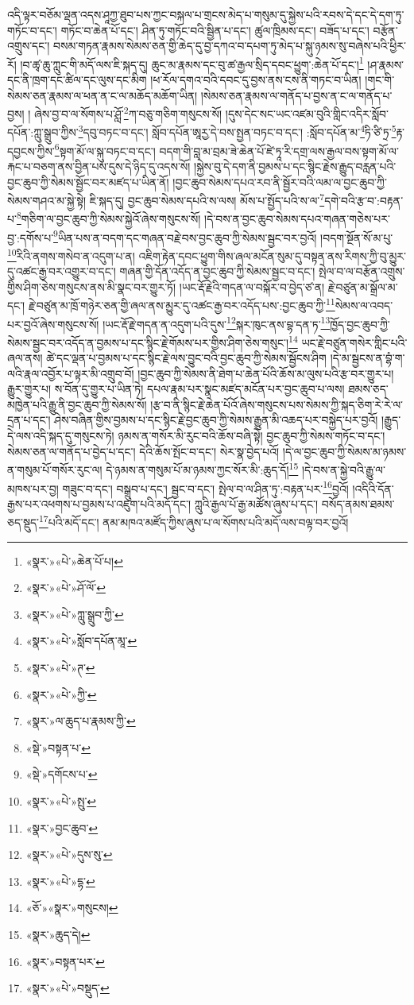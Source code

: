 འདི་ལྟར་བཅོམ་ལྡན་འདས་ཤཱཀྱ་ཐུབ་པས་ཀྱང་བསྐལ་པ་གྲངས་མེད་པ་གསུམ་དུ་སྐྱེས་པའི་རབས་དེ་དང་དེ་དག་ཏུ་གཏོང་བ་དང་། གཏོང་བ་ཆེན་པོ་དང་། ཤིན་ཏུ་གཏོང་བའི་སྦྱིན་པ་དང་། ཚུལ་ཁྲིམས་དང་། བཟོད་པ་དང་། བརྩོན་འགྲུས་དང་། བསམ་གཏན་རྣམས་སེམས་ཅན་གྱི་ཆེད་དུ་བྱ་དཀའ་བ་དཔག་ཏུ་མེད་པ་སྐུ་ཉམས་སུ་བཞེས་པའི་ཕྱིར་རོ། །བ་ཚྭ་ཆུ་ཀླུང་གི་མདོ་ལས་ཇི་སྐད་དུ། ཆུང་མ་རྣམས་དང་བུ་ཚ་རྒྱལ་སྲིད་དབང་ཕྱུག་:ཆེན་པོ་དང་།\footnote{«སྣར་»«པེ་»ཆེན་པོ་པ།} །ཤ་རྣམས་དང་ནི་ཁྲག་དང་ཚིལ་དང་ལུས་དང་མིག །ཕ་རོལ་དགའ་བའི་དབང་དུ་བྱས་ནས་ངས་ནི་གཏང་བ་ཡིན། །གང་གི་སེམས་ཅན་རྣམས་ལ་ཕན་ན་ང་ལ་མཆོད་མཆོག་ཡིན། །སེམས་ཅན་རྣམས་ལ་གནོད་པ་བྱས་ན་ང་ལ་གནོད་པ་བྱས། །
ཞེས་བྱ་བ་ལ་སོགས་པ་ཤློ་\footnote{«སྣར་»«པེ་»ཤོ་ལོ་}ཀ་བཅུ་གཅིག་གསུངས་སོ། །དུས་དེང་སང་ཡང་འཛམ་བུའི་གླིང་འདིར་སློབ་དཔོན་:ཀླུ་སྒྲུབ་ཀྱིས་\footnote{«སྣར་»«པེ་»ཀླུ་སྒྲུབ་ཀྱི་}དབུ་བཏང་བ་དང་། སློབ་དཔོན་ཨཱརྱ་དེ་བས་སྤྱན་བཏང་བ་དང་། :སློབ་དཔོན་མ་\footnote{«སྣར་»«པེ་»སློབ་དཔོན་མཱ་}ཏི་ཙི་ཏྲ་\footnote{«སྣར་»«པེ་»ཊ་}རྟ་དབྱངས་ཀྱིས་\footnote{«སྣར་»«པེ་»ཀྱི་}སྟག་མོ་ལ་སྐུ་བཏང་བ་དང་། བདག་གི་བླ་མ་བྲམ་ཟེ་ཆེན་པོ་ཛེ་ཏཱ་རི་དགྲ་ལས་རྒྱལ་བས་སྟག་མོ་ལ་རྐང་པ་བཅག་ནས་བྱིན་པས་དུས་དེ་ཉིད་དུ་འདས་སོ། །སྐྱེས་བུ་དེ་དག་ནི་བྱམས་པ་དང་སྙིང་རྗེས་རྒྱུད་བརླན་པའི་བྱང་ཆུབ་ཀྱི་སེམས་སྦྱོང་བར་མཛད་པ་ཡིན་ནོ། །བྱང་ཆུབ་སེམས་དཔའ་རབ་ནི་སྦྱོར་བའི་ལམ་ལ་བྱང་ཆུབ་ཀྱི་སེམས་གཤའ་མ་སྐྱེ་སྟེ། ཇི་སྐད་དུ། བྱང་ཆུབ་སེམས་དཔའི་ས་ལས། མོས་པ་སྤྱོད་པའི་ས་ལ་\footnote{«སྣར་»ལ་ཆུད་པ་རྣམས་ཀྱི་}དགེ་བའི་རྩ་བ་:བརྟན་པ་\footnote{«སྡེ་»བསྟན་པ་}གཅིག་ལ་བྱང་ཆུབ་ཀྱི་སེམས་སྐྱེའོ་ཞེས་གསུངས་སོ། །དེ་བས་ན་བྱང་ཆུབ་སེམས་དཔའ་གཞན་གཅེས་པར་བྱ་:དགོས་པ་\footnote{«སྡེ་»དགོངས་པ་}ཡིན་པས་ན་བདག་དང་གཞན་བརྗེ་བས་བྱང་ཆུབ་ཀྱི་སེམས་སྦྱང་བར་བྱའོ། །བདག་སྔོན་སོ་མ་པུ་\footnote{«སྣར་»«པེ་»སྤུ་}རིའི་ནགས་གསེབ་ན་འདུག་པ་ན། འཇིག་རྟེན་དབང་ཕྱུག་གིས་ཞལ་མངོན་སུམ་དུ་བསྟན་ནས་རིགས་ཀྱི་བུ་མྱུར་དུ་འཚང་རྒྱ་བར་འགྱུར་བ་དང་། གཞན་གྱི་དོན་འདོད་ན་བྱང་ཆུབ་ཀྱི་སེམས་སྦྱང་བ་དང་། སྤེལ་བ་ལ་བརྩོན་འགྲུས་གྱིས་ཤིག་ཅེས་གསུངས་ནས་མི་སྣང་བར་གྱུར་ཏོ། །ཡང་རྡོ་རྗེའི་གདན་ལ་བསྐོར་བ་བྱེད་ཙ་ན། རྗེ་བཙུན་མ་སྒྲོལ་མ་དང་། རྗེ་བཙུན་མ་ཁྲོ་གཉེར་ཅན་གྱི་ཞལ་ནས་མྱུར་དུ་འཚང་རྒྱ་བར་འདོད་པས་:བྱང་ཆུབ་ཀྱི་\footnote{«སྣར་»བྱང་ཆུབ་}སེམས་ལ་འབད་པར་བྱའོ་ཞེས་གསུངས་སོ། །ཡང་རྡོ་རྗེ་གདན་ན་འདུག་པའི་དུས་\footnote{«སྣར་»«པེ་»དུས་སུ་}སྐར་ཁུང་ནས་བྷ་དན་ཏ་\footnote{«སྣར་»«པེ་»དྷ་}ཁྱོད་བྱང་ཆུབ་ཀྱི་སེམས་སྦྱང་བར་འདོད་ན་བྱམས་པ་དང་སྙིང་རྗེ་གོམས་པར་གྱིས་ཤིག་ཅེས་གསུང་།\footnote{«ཅོ་»«སྣར་»གསུངས།} ཡང་རྗེ་བཙུན་གསེར་གླིང་པའི་ཞལ་ནས། ཚེ་དང་ལྡན་པ་བྱམས་པ་དང་སྙིང་རྗེ་ལས་བྱུང་བའི་བྱང་ཆུབ་ཀྱི་སེམས་སྦྱོངས་ཤིག །དེ་མ་སྦྱངས་ན་བྷཾ་ག་ལའི་རྣལ་འབྱོར་པ་ལྟར་མི་འགྲུབ་བོ། །བྱང་ཆུབ་ཀྱི་སེམས་ནི་ཐེག་པ་ཆེན་པོའི་ཆོས་མ་ལུས་པའི་རྩ་བར་གྱུར་པ། རྒྱུར་གྱུར་པ། ས་བོན་དུ་གྱུར་པ་ཡིན་ཏེ། དཔལ་རྣམ་པར་སྣང་མཛད་མངོན་པར་བྱང་ཆུབ་པ་ལས། ཐམས་ཅད་མཁྱེན་པའི་རྒྱུ་ནི་བྱང་ཆུབ་ཀྱི་སེམས་སོ། །རྩ་བ་ནི་སྙིང་རྗེ་ཆེན་པོའོ་ཞེས་གསུངས་པས་སེམས་ཀྱི་སྐད་ཅིག་རེ་རེ་ལ་དྲན་པ་དང་། ཤེས་བཞིན་གྱིས་བྱམས་པ་དང་སྙིང་རྗེ་བྱང་ཆུབ་ཀྱི་སེམས་རྒྱུན་མི་འཆད་པར་བསྐྱེད་པར་བྱའོ། །རྒྱུད་དེ་ལས་འདི་སྐད་དུ་གསུངས་ཏེ། ཉམས་ན་གསོར་མི་རུང་བའི་ཆོས་བཞི་སྟེ། བྱང་ཆུབ་ཀྱི་སེམས་གཏོང་བ་དང་། སེམས་ཅན་ལ་གནོད་པ་བྱེད་པ་དང་། དེའི་ཆོས་སྤོང་བ་དང་། སེར་སྣ་བྱེད་པའོ། །དེ་ལ་བྱང་ཆུབ་ཀྱི་སེམས་མ་ཉམས་ན་གསུམ་པོ་གསོར་རུང་ལ། དེ་ཉམས་ན་གསུམ་པོ་མ་ཉམས་ཀྱང་སོར་མི་:ཆུད་དོ།\footnote{«སྣར་»ཆུད་དེ།} །དེ་བས་ན་སྐྱེ་བའི་རྒྱུ་ལ་མཁས་པར་བྱ། གཟུང་བ་དང་། བསྒྲུབ་པ་དང་། སྦྱང་བ་དང་། སྤེལ་བ་ལ་ཤིན་ཏུ་:བརྟན་པར་\footnote{«སྣར་»བསྟན་པར་}བྱའོ། །འདིའི་དོན་རྒྱས་པར་འཕགས་པ་བྱམས་པ་འཇུག་པའི་མདོ་དང་། ཀླུའི་རྒྱལ་པོ་རྒྱ་མཚོས་ཞུས་པ་དང་། བསོད་ནམས་ཐམས་ཅད་སྡུད་\footnote{«སྣར་»«པེ་»བསྡུད་}པའི་མདོ་དང་། ནམ་མཁའ་མཛོད་ཀྱིས་ཞུས་པ་ལ་སོགས་པའི་མདོ་ལས་བལྟ་བར་བྱའོ། 